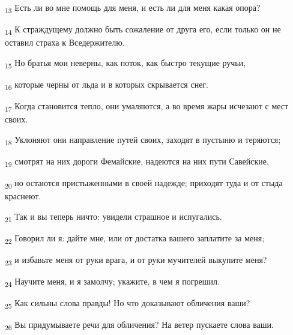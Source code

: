 \begin{tcolorbox}
\textsubscript{13} Есть ли во мне помощь для меня, и есть ли для меня какая опора?
\end{tcolorbox}
\begin{tcolorbox}
\textsubscript{14} К страждущему должно быть сожаление от друга его, если только он не оставил страха к Вседержителю.
\end{tcolorbox}
\begin{tcolorbox}
\textsubscript{15} Но братья мои неверны, как поток, как быстро текущие ручьи,
\end{tcolorbox}
\begin{tcolorbox}
\textsubscript{16} которые черны от льда и в которых скрывается снег.
\end{tcolorbox}
\begin{tcolorbox}
\textsubscript{17} Когда становится тепло, они умаляются, а во время жары исчезают с мест своих.
\end{tcolorbox}
\begin{tcolorbox}
\textsubscript{18} Уклоняют они направление путей своих, заходят в пустыню и теряются;
\end{tcolorbox}
\begin{tcolorbox}
\textsubscript{19} смотрят на них дороги Фемайские, надеются на них пути Савейские,
\end{tcolorbox}
\begin{tcolorbox}
\textsubscript{20} но остаются пристыженными в своей надежде; приходят туда и от стыда краснеют.
\end{tcolorbox}
\begin{tcolorbox}
\textsubscript{21} Так и вы теперь ничто: увидели страшное и испугались.
\end{tcolorbox}
\begin{tcolorbox}
\textsubscript{22} Говорил ли я: дайте мне, или от достатка вашего заплатите за меня;
\end{tcolorbox}
\begin{tcolorbox}
\textsubscript{23} и избавьте меня от руки врага, и от руки мучителей выкупите меня?
\end{tcolorbox}
\begin{tcolorbox}
\textsubscript{24} Научите меня, и я замолчу; укажите, в чем я погрешил.
\end{tcolorbox}
\begin{tcolorbox}
\textsubscript{25} Как сильны слова правды! Но что доказывают обличения ваши?
\end{tcolorbox}
\begin{tcolorbox}
\textsubscript{26} Вы придумываете речи для обличения? На ветер пускаете слова ваши.
\end{tcolorbox}
